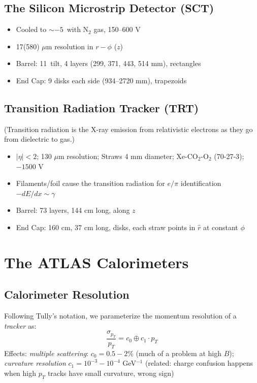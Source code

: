 \subsection{The Silicon Microstrip Detector (SCT)}
\begin{itemize}
\item Cooled to $\sim-5$\celsius\  with N$_2$ gas, 150--600 V
\item 17(580) $\mu$m resolution in $r-\phi$ ($z$)
\item Barrel: 11\degree\ tilt, 4 layers (299, 371, 443, 514 mm), rectangles
\item End Cap: 9 disks each side (934--2720 mm), trapezoids
\end{itemize}
\subsection{Transition Radiation Tracker (TRT)}
(Transition radiation is the X-ray emission from relativistic electrons as they go from dielectric to gas.)
\begin{itemize}
\item $\left|\eta\right|<2$; 130 $\mu$m resolution; Straws 4 mm diameter; Xe-CO$_2$-O$_2$ (70-27-3); $-1500$ V
\item Filaments/foil cause the transition radiation for $e/\pi$ identification $-dE/dx\sim\gamma$
\item Barrel: 73 layers, 144 cm long, along $z$
\item End Cap: 160 cm, 37 cm long, disks, each straw points in $\hat{r}$ at constant $\phi$
\end{itemize}


\section{The ATLAS Calorimeters}
\subsection{Calorimeter Resolution}
Following Tully's notation, we parameterize the momentum resolution of a \emph{tracker} as:
\begin{equation}
\frac{\sigma_{p_T}}{p_T}=c_0\oplus c_1\cdot p_T
\label{eqn:ptres}
\end{equation}
Effects: \emph{multiple scattering}: $c_0=0.5-2\%$ (much of a problem at high $B$); \emph{curvature resolution} $c_1=10^{-3}-10^{-4}$ GeV$^{-1}$ (related: charge confusion happens when high $p_T$ tracks have small curvature, wrong sign)

